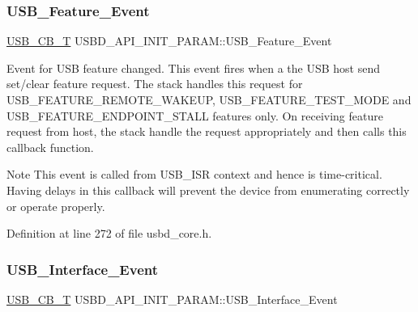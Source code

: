 \subsubsection{\texorpdfstring{U\+S\+B\+\_\+\+Feature\+\_\+\+Event}{USB\_Feature\_Event}}
{\footnotesize\ttfamily \hyperlink{group___u_s_b_d___core_ga0404ce046312aa5c798cc4a05c417e46}{U\+S\+B\+\_\+\+C\+B\+\_\+T} U\+S\+B\+D\+\_\+\+A\+P\+I\+\_\+\+I\+N\+I\+T\+\_\+\+P\+A\+R\+A\+M\+::\+U\+S\+B\+\_\+\+Feature\+\_\+\+Event}

Event for U\+SB feature changed. This event fires when a the U\+SB host send set/clear feature request. The stack handles this request for U\+S\+B\+\_\+\+F\+E\+A\+T\+U\+R\+E\+\_\+\+R\+E\+M\+O\+T\+E\+\_\+\+W\+A\+K\+E\+UP, U\+S\+B\+\_\+\+F\+E\+A\+T\+U\+R\+E\+\_\+\+T\+E\+S\+T\+\_\+\+M\+O\+DE and U\+S\+B\+\_\+\+F\+E\+A\+T\+U\+R\+E\+\_\+\+E\+N\+D\+P\+O\+I\+N\+T\+\_\+\+S\+T\+A\+LL features only. On receiving feature request from host, the stack handle the request appropriately and then calls this callback function. ~\newline
 \begin{DoxyNote}{Note}
This event is called from U\+S\+B\+\_\+\+I\+SR context and hence is time-\/critical. Having delays in this callback will prevent the device from enumerating correctly or operate properly. 
\end{DoxyNote}


Definition at line 272 of file usbd\+\_\+core.\+h.

\mbox{\label{struct_u_s_b_d___a_p_i___i_n_i_t___p_a_r_a_m_a8582d6606f3154437b513800a6bff4c9}} 
\subsubsection{\texorpdfstring{U\+S\+B\+\_\+\+Interface\+\_\+\+Event}{USB\_Interface\_Event}}
{\footnotesize\ttfamily \hyperlink{group___u_s_b_d___core_ga0404ce046312aa5c798cc4a05c417e46}{U\+S\+B\+\_\+\+C\+B\+\_\+T} U\+S\+B\+D\+\_\+\+A\+P\+I\+\_\+\+I\+N\+I\+T\+\_\+\+P\+A\+R\+A\+M\+::\+U\+S\+B\+\_\+\+Interface\+\_\+\+Event}

